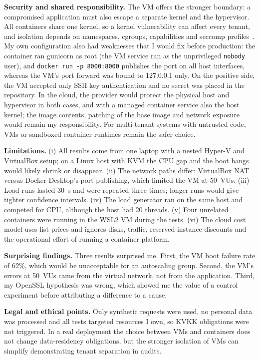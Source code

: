 \documentclass[conference,a4paper]{IEEEtran}
\begin{document}
\textbf{Security and shared responsibility.} The VM offers the stronger boundary: a compromised application must also escape a separate kernel and the hypervisor. All containers share one kernel, so a kernel vulnerability can affect every tenant, and isolation depends on namespaces, cgroups, capabilities and seccomp profiles~\cite{dockersec}. My own configuration also had weaknesses that I would fix before production: the container ran gunicorn as root (the VM service ran as the unprivileged \texttt{nobody} user), and \texttt{docker run -p 8000:8000} publishes the port on all host interfaces, whereas the VM's port forward was bound to 127.0.0.1 only. On the positive side, the VM accepted only SSH key authentication and no secret was placed in the repository. In the cloud, the provider would protect the physical host and hypervisor in both cases, and with a managed container service also the host kernel; the image contents, patching of the base image and network exposure would remain my responsibility. For multi-tenant systems with untrusted code, VMs or sandboxed container runtimes remain the safer choice.

\textbf{Limitations.} (i) All results come from one laptop with a nested Hyper-V and VirtualBox setup; on a Linux host with KVM the CPU gap and the boot hangs would likely shrink or disappear. (ii) The network paths differ: VirtualBox NAT versus Docker Desktop's port publishing, which limited the VM at 50~VUs. (iii) Load runs lasted 30~s and were repeated three times; longer runs would give tighter confidence intervals. (iv) The load generator ran on the same host and competed for CPU, although the host had 20 threads. (v) Four unrelated containers were running in the WSL2 VM during the tests. (vi) The cloud cost model uses list prices and ignores disks, traffic, reserved-instance discounts and the operational effort of running a container platform.

\textbf{Surprising findings.} Three results surprised me. First, the VM boot failure rate of 62\%, which would be unacceptable for an autoscaling group. Second, the VM's errors at 50~VUs came from the virtual network, not from the application. Third, my OpenSSL hypothesis was wrong, which showed me the value of a control experiment before attributing a difference to a cause.

\textbf{Legal and ethical points.} Only synthetic requests were used, no personal data was processed and all tests targeted resources I own, so KVKK obligations were not triggered. In a real deployment the choice between VMs and containers does not change data-residency obligations, but the stronger isolation of VMs can simplify demonstrating tenant separation in audits.
\end{document}
